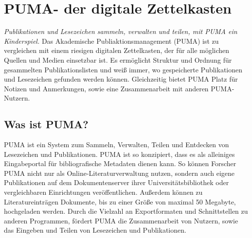 \section{PUMA- der digitale Zettelkasten}
\textit{Publikationen und Lesezeichen sammeln, verwalten und teilen, mit PUMA ein Kinderspiel.}\newline
\newline
Das Akademische Publiaktionsmanagement (PUMA) ist zu vergleichen mit einem riesigen digitalen Zettelkasten, der für alle möglichen Quellen und Medien einsetzbar ist. Es ermöglicht Struktur und Ordnung für gesammelten Publikationslisten und weiß immer, wo gespeicherte Publikationen und Lesezeichen gefunden werden können. Gleichzeitig bietet PUMA Platz für Notizen und Anmerkungen, sowie eine Zusammenarbeit mit anderen PUMA-Nutzern. 
\subsection{Was ist PUMA?}
PUMA ist ein System zum Sammeln, Verwalten, Teilen und Entdecken von Lesezeichen und Publikationen. \newline
\newline
PUMA ist so konzipiert, dass es als alleiniges Eingabeportal für bibliografische Metadaten dienen kann. So können Forscher PUMA nicht nur als Online-Literaturverwaltung nutzen, sondern auch eigene Publikationen auf dem Dokumentenserver ihrer Universitätsbibliothek oder vergleichbaren Einrichtungen veröffentlichen. Außerdem können zu Literatureinträgen Dokumente, bis zu einer Größe von maximal 50 Megabyte, hochgeladen werden. \newline
Durch die Vielzahl an Exportformaten und Schnittstellen zu anderen Programmen, fördert PUMA  die Zusammenarbeit von Nutzern, sowie das Eingeben und Teilen von Lesezeichen und Publikationen. 
